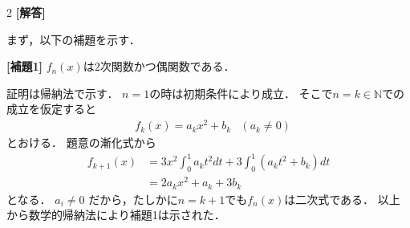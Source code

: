 \documentclass[../../main.tex]{subfiles}
\begin{document}
\setcounter{equation}{0}
\begin{oframed}
  
\end{oframed}
\setlength{\columnseprule}{0.4pt}
\begin{multicols}{2}
  {\bf [解答]}

  まず，以下の補題を示す．

  \textbf{[補題1]} $f_n(x)$は$2$次関数かつ偶関数である．

  証明は帰納法で示す．
  $n=1$の時は初期条件により成立．
  そこで$n = k \in \mathbb{N}$での成立を仮定すると
  \begin{align}
    & f_k(x) = a_k x^2 + b_k & (a_k \neq 0) \label{eq:1}
  \end{align}
  とおける．
  題意の漸化式から
  \begin{align}
    f_{k+1}(x)
    & = 3x^2 \int_0^1 a_k t^2 dt + 3 \int_0^1 (a_k t^2 + b_k) dt \\
    & = 2 a_k x^2 + a_k + 3 b_k \label{eq:2}
  \end{align}
  となる．
  $a_i \neq 0$ だから，たしかに$n=k+1$でも$f_{n}(x)$は二次式である．
  以上から数学的帰納法により補題1は示された．


\end{multicols}
\end{document}
